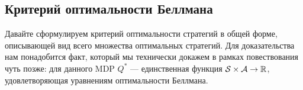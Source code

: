 





\subsection{Критерий оптимальности Беллмана}

Давайте сформулируем критерий оптимальности стратегий в общей форме, описывающей вид всего множества оптимальных стратегий. Для доказательства нам понадобится факт, который мы технически докажем в рамках повествования чуть позже: для данного MDP $Q^*$ --- единственная функция $\mathcal{S} \times \mathcal{A} \to \mathbb{R}$, удовлетворяющая уравнениям оптимальности Беллмана.

